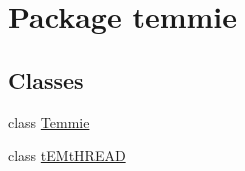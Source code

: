\hypertarget{namespacetemmie}{}\section{Package temmie}
\label{namespacetemmie}
\subsection*{Classes}
\begin{DoxyCompactItemize}
\item 
class \mbox{\hyperlink{classtemmie_1_1_temmie}{Temmie}}
\item 
class \mbox{\hyperlink{classtemmie_1_1t_e_mt_h_r_e_a_d}{t\+E\+Mt\+H\+R\+E\+AD}}
\end{DoxyCompactItemize}
